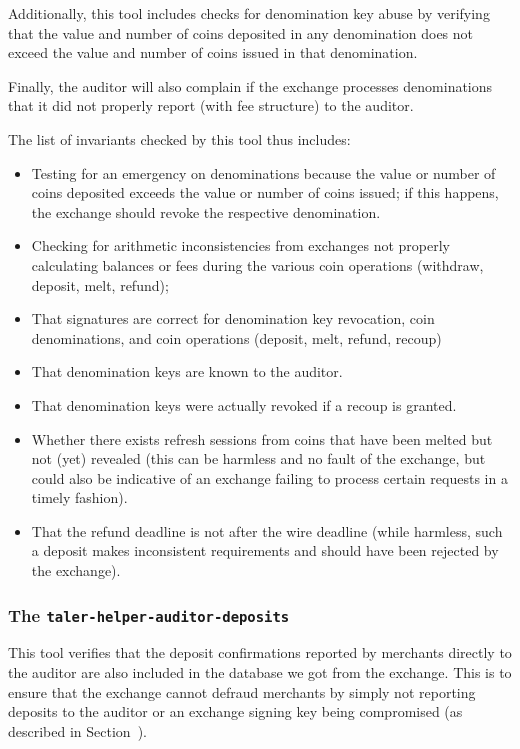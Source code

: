 Additionally, this tool includes checks for denomination key abuse by
verifying that the value and number of coins deposited in any denomination
does not exceed the value and number of coins issued in that denomination.

Finally, the auditor will also complain if the exchange processes
denominations that it did not properly report (with fee structure) to the
auditor.

The list of invariants checked by this tool thus includes:
\begin{itemize}
\item Testing for an
  emergency on denominations because the value or number
  of coins deposited exceeds the value or number of coins
  issued; if this happens, the exchange should revoke the
  respective denomination.
\item Checking for arithmetic inconsistencies from exchanges
  not properly calculating balances or fees during the
  various coin operations (withdraw, deposit, melt, refund);
\item That signatures are correct for denomination key revocation,
  coin denominations,
  and coin operations (deposit, melt, refund, recoup)
\item That denomination keys are known to the auditor.
\item That denomination keys were actually revoked if a recoup
  is granted.
\item Whether there exists refresh sessions from coins that
  have been melted but not (yet) revealed
  (this can be harmless and no fault of the exchange, but
  could also be indicative of an exchange failing to process
  certain requests in a timely fashion).
\item That the refund deadline is not after
  the wire deadline (while harmless, such a deposit
  makes inconsistent requirements and should have been
  rejected by the exchange).
\end{itemize}


\subsubsection{The \texttt{taler-helper-auditor-deposits}}

This tool verifies that the deposit confirmations reported by merchants
directly to the auditor are also included in the database we got from the
exchange.  This is to ensure that the exchange cannot defraud merchants by
simply not reporting deposits to the auditor or an
exchange signing key being compromised (as described in
Section~\label{sec:signkey:compromise}).


